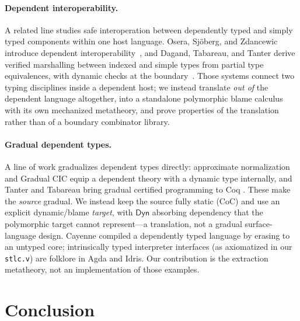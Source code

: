 \documentclass[acmsmall,anonymous=false,nonacm]{acmart}
\newcommand{\dyn}{\ensuremath{\mathsf{Dyn}}}
\begin{document}
\paragraph{Dependent interoperability.}
A related line studies safe interoperation between dependently typed and
simply typed components within one host language. Osera, Sj{\"o}berg, and
Zdancewic introduce dependent interoperability~\cite{osera2012dependent}, and
Dagand, Tabareau, and Tanter derive verified marshalling between indexed and
simple types from partial type equivalences, with dynamic checks at the
boundary~\cite{dagand2018interop}. Those systems connect two typing
disciplines inside a dependent host; we instead translate \emph{out of} the
dependent language altogether, into a standalone polymorphic blame calculus
with its own mechanized metatheory, and prove properties of the translation
rather than of a boundary combinator library.

\paragraph{Gradual dependent types.}
A line of work gradualizes dependent types directly: approximate normalization
\cite{eremondi2019approximate} and Gradual CIC \cite{lennon2022gradual} equip a
dependent theory with a dynamic type internally, and Tanter and Tabareau bring
gradual certified programming to Coq \cite{tanter2015gradualcertified}. These
make the \emph{source} gradual. We instead keep the source fully static (CoC) and
use an explicit dynamic/blame \emph{target}, with $\dyn$ absorbing dependency
that the polymorphic target cannot represent---a translation, not a gradual
surface-language design.
Cayenne \cite{augustsson1998cayenne} compiled a dependently typed language by
erasing to an untyped core; intrinsically typed interpreter interfaces (as
axiomatized in our \texttt{stlc.v}) are folklore in Agda
\cite{norell2008agda} and Idris. Our contribution is the extraction metatheory,
not an implementation of those examples.

\section{Conclusion}\label{sec:conclusion}
\end{document}
